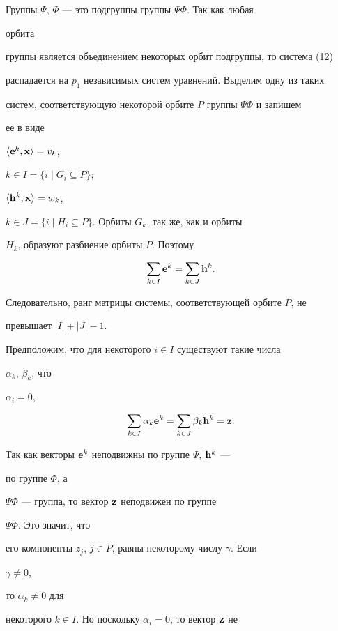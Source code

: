 \begin{pf}


Группы $\Psi$, $\Phi$ --- это подгруппы группы $\Psi\Phi$. Так как любая


орбита


группы является объединением некоторых орбит подгруппы, то система (12)


распадается на $p_1$ независимых систем уравнений. Выделим одну из таких


систем, соответствующую некоторой орбите $P$ группы $\Psi\Phi$ и запишем


ее в виде


$\langle\bold e^k,\bold x\rangle=v_k$,


$k\in I=\{i\mid G_i\subseteq P\}$;


$\langle\bold h^k,\bold x\rangle=w_k$,


$k\in J=\{i\mid H_i\subseteq P\}$. Орбиты $G_k$, так же, как и орбиты


$H_k$, образуют разбиение орбиты $P$. Поэтому


$$


\sum_{k\in I}\bold e^k=\sum_{k\in J}\bold h^k.


$$


Следовательно, ранг матрицы системы, соответствующей орбите $P$, не


превышает $|I|+|J|-1$.





Предположим, что для некоторого $i\in I$ существуют такие числа


$\alpha_k$, $\beta_k$, что


$\alpha_i=0$,


$$


\sum_{k\in I}\alpha_k\bold e^k=\sum_{k\in J}\beta_k\bold h^k=\bold z.


$$


Так как векторы $\bold e^k$ неподвижны по группе $\Psi$, $\bold h^k$ ---


по группе $\Phi$, а


$\Psi\Phi$ --- группа, то вектор $\bold z$ неподвижен по группе


$\Psi\Phi$. Это значит, что


его компоненты $z_j$, $j\in P$, равны некоторому числу $\gamma$. Если


$\gamma\ne 0$,


то $\alpha_k\ne 0$ для


некоторого $k\in I$. Но поскольку $\alpha_i=0$, то вектор $\bold z$ не



\end{pf}
